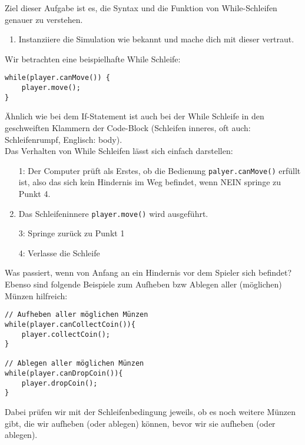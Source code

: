 

Ziel dieser Aufgabe ist es, die Syntax und die Funktion von While-Schleifen genauer zu verstehen.

\begin{enumerate}
    \item Instanziiere die Simulation wie bekannt und mache dich mit dieser vertraut.
\end{enumerate}


\begin{Infobox}
    Wir betrachten eine beispielhafte While Schleife:

    \begin{lstlisting}[breaklines=true, numbers=none]
while(player.canMove()) {
    player.move();
}
    \end{lstlisting}

    Ähnlich wie bei dem If-Statement ist auch bei der While Schleife in den geschweiften Klammern der Code-Block (Schleifen inneres, oft auch: Schleifenrumpf, Englisch: body).\\

    Das Verhalten von While Schleifen lässt sich einfach darstellen:
    \begin{enumerate}
        \item[1:] Der Computer prüft als Erstes, ob die Bedienung \lstinline{palyer.canMove()} erfüllt ist, also das sich kein Hindernis im Weg befindet, wenn NEIN springe zu Punkt 4.
        \item[2:] Das Schleifeninnere \lstinline{player.move()} wird ausgeführt.
        \item[3:] Springe zurück zu Punkt 1
        \item[4:] Verlasse die Schleife
    \end{enumerate}

    Was passiert, wenn von Anfang an ein Hindernis vor dem Spieler sich befindet?\\

    Ebenso sind folgende Beispiele zum Aufheben bzw Ablegen aller (möglichen) Münzen hilfreich:

    \begin{lstlisting}[breaklines=true, numbers=none]
// Aufheben aller möglichen Münzen
while(player.canCollectCoin()){
    player.collectCoin();
}

// Ablegen aller möglichen Münzen
while(player.canDropCoin()){
    player.dropCoin();
}
    \end{lstlisting}

    Dabei prüfen wir mit der Schleifenbedingung jeweils, ob es noch weitere Münzen gibt, die wir aufheben (oder ablegen) können, bevor wir sie aufheben (oder ablegen).
\end{Infobox}


